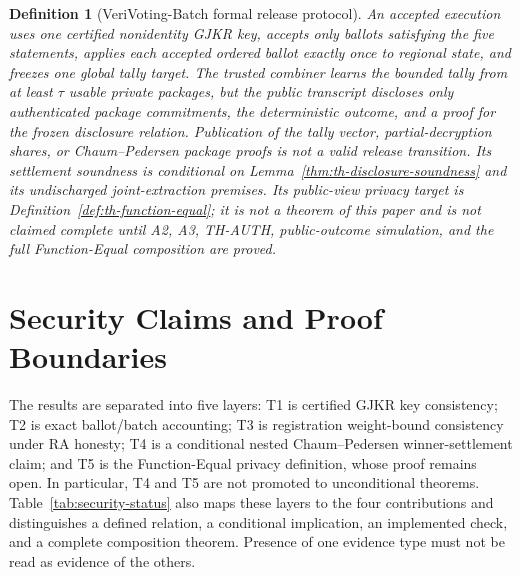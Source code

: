 \documentclass[pdflatex,sn-mathphys-num]{sn-jnl}%
\theoremstyle{thmstyleone}%
\theoremstyle{thmstyletwo}%
\theoremstyle{thmstylethree}%
\newtheorem{definition}{Definition}%
\begin{document}
\begin{definition}[VeriVoting-Batch formal release protocol]\label{def:vv-security}
An accepted execution uses one certified nonidentity GJKR key, accepts only
ballots satisfying the five statements, applies each accepted ordered ballot
exactly once to regional state, and freezes one global tally target.  The
trusted combiner learns the bounded tally from at least $\tau$ usable private
packages, but the public transcript discloses only authenticated package
commitments, the deterministic outcome, and a proof for the frozen disclosure
relation.  Publication of the tally vector, partial-decryption shares, or
Chaum--Pedersen package proofs is not a valid release transition.
Its settlement soundness is conditional on Lemma~\ref{thm:th-disclosure-soundness}
and its undischarged joint-extraction premises.  Its public-view privacy target
is Definition~\ref{def:th-function-equal}; it is not a theorem of this paper
and is not claimed complete until A2, A3,
TH-AUTH, public-outcome simulation, and the full Function-Equal composition
are proved.
\end{definition}

\section{Security Claims and Proof Boundaries}\label{sec4}

The results are separated into five layers: T1 is certified GJKR key
consistency; T2 is exact ballot/batch accounting; T3 is registration
weight-bound consistency under RA honesty; T4 is a conditional nested
Chaum--Pedersen winner-settlement claim; and T5 is the Function-Equal privacy
definition, whose proof remains open.  In particular, T4 and T5 are not
promoted to unconditional theorems.  Table~\ref{tab:security-status} also maps
these layers to the four contributions and distinguishes a defined relation,
a conditional implication, an implemented check, and a complete composition
theorem.  Presence of one evidence type must not be read as evidence of the
others.
\end{document}
